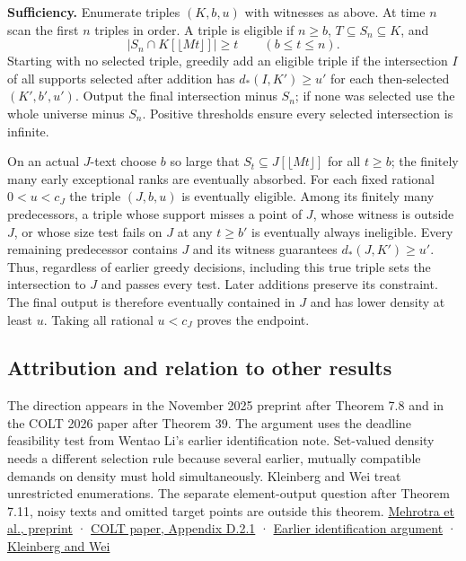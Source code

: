 \documentclass[11pt]{article}
\begin{document}
\textbf{Sufficiency.} Enumerate triples \((K,b,u)\) with witnesses as above. At time \(n\) scan the first \(n\) triples in order. A triple is eligible if \(n\ge b\), \(T\subseteq S_n\subseteq K\), and
\[|S_n\cap K[\lfloor Mt\rfloor]|\ge t\qquad(b\le t\le n).\]
Starting with no selected triple, greedily add an eligible triple if the intersection \(I\) of all supports selected after addition has \(d_*(I,K')\ge u'\) for each then-selected \((K',b',u')\). Output the final intersection minus \(S_n\); if none was selected use the whole universe minus \(S_n\). Positive thresholds ensure every selected intersection is infinite.

On an actual \(J\)-text choose \(b\) so large that \(S_t\subseteq J[\lfloor Mt\rfloor]\) for all \(t\ge b\); the finitely many early exceptional ranks are eventually absorbed. For each fixed rational \(0<u<c_J\) the triple \((J,b,u)\) is eventually eligible. Among its finitely many predecessors, a triple whose support misses a point of \(J\), whose witness is outside \(J\), or whose size test fails on \(J\) at any \(t\ge b'\) is eventually always ineligible. Every remaining predecessor contains \(J\) and its witness guarantees \(d_*(J,K')\ge u'\). Thus, regardless of earlier greedy decisions, including this true triple sets the intersection to \(J\) and passes every test. Later additions preserve its constraint. The final output is therefore eventually contained in \(J\) and has lower density at least \(u\). Taking all rational \(u<c_J\) proves the endpoint.

\subsection{Attribution and relation to other results}\label{attribution-and-relation-to-other-results}

The direction appears in the November 2025 preprint after Theorem 7.8 and in the COLT 2026 paper after Theorem 39. The argument uses the deadline feasibility test from Wentao Li's earlier identification note. Set-valued density needs a different selection rule because several earlier, mutually compatible demands on density must hold simultaneously. Kleinberg and Wei treat unrestricted enumerations. The separate element-output question after Theorem 7.11, noisy texts and omitted target points are outside this theorem. \href{https://arxiv.org/abs/2511.07417}{Mehrotra et al., preprint} · \href{https://proceedings.mlr.press/v336/mehrotra26a.html}{COLT paper, Appendix D.2.1} · \href{https://github.com/VictorLiwentao/solved-problems/tree/8e1396e2d922e88b5c96559ceedee33de3988a5d/results/learning-theory/bounded-displacement-identification}{Earlier identification argument} · \href{https://arxiv.org/abs/2504.14370}{Kleinberg and Wei}
\end{document}
